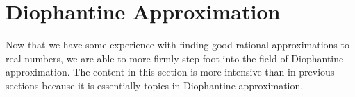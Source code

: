 \documentclass[../notes.tex]{subfiles}
\begin{document}
\section{Diophantine Approximation}

Now that we have some experience with finding good rational approximations to real numbers, we are able to more firmly step foot into the field of Diophantine approximation. The content in this section is more intensive than in previous sections because it is essentially topics in Diophantine approximation.
\end{document}
